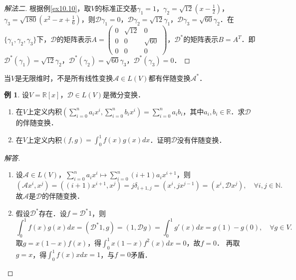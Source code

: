 \documentclass[a4paper,fontset=windows]{ctexbook}
\theoremstyle{definition}
\newtheorem{example}{例}[chapter]
\begin{document}
\begin{proof}[解法二]
根据例\ref{ex10.10}，取$V$的标准正交基$\gamma_1=1$，$\gamma_2=\sqrt{12}(x-\frac{1}{2})$，$\gamma_3=\sqrt{180}(x^2-x+\frac{1}{6})$，则$\mathcal{D}\gamma_1=0$，$\mathcal{D}\gamma_2=\sqrt{12}\gamma_1$，$\mathcal{D}\gamma_3=\sqrt{60}\gamma_2$．在$\{\gamma_1,\gamma_2,\gamma_3\}$下，$\mathcal{D}$的矩阵表示$A=\begin{pmatrix}0&\sqrt{12}&0 \\ 0&0&\sqrt{60} \\ 0&0&0\end{pmatrix}$，$\mathcal{D}^*$的矩阵表示$B=A^T$．即$\mathcal{D}^*(\gamma_1)=\sqrt{12}\gamma_2$，$\mathcal{D}^*(\gamma_2)=\sqrt{60}\gamma_3$，$\mathcal{D}^*(\gamma_3)=0$．
\end{proof}

当$V$是无限维时，不是所有线性变换$\mathcal{A}\in L(V)$都有伴随变换$\mathcal{A}^*$．

\begin{example}
设$V=\mathbb{R}[x]$，$\mathcal{D}\in L(V)$是微分变换．
\begin{enumerate}
\item 在$V$上定义内积$\left(\sum\limits_{i=0}^na_ix^i,\sum\limits_{i=0}^nb_ix^i\right)=\sum\limits_{i=0}^na_ib_i$，其中$a_i,b_i\in\mathbb{R}$．求$\mathcal{D}$的伴随变换．

\item 在$V$上定义内积$(f,g)=\int_0^1f(x)g(x)dx$．证明$\mathcal{D}$没有伴随变换．
\end{enumerate}
\end{example}

\begin{proof}[解答]~
\begin{enumerate}
\item 设$\mathcal{A}\in L(V)$，$\sum\limits_{i=0}^na_ix^i\mapsto\sum\limits_{i=0}^n(i+1)a_ix^{i+1}$，则
$$(\mathcal{A}x^i,x^j)=\left((i+1)x^{i+1},x^j\right)=j\delta_{i+1,j}=\left(x^i,jx^{j-1}\right)=(x^i,\mathcal{D}x^j),\quad\forall i,j\in\mathbb{N}.$$
故$\mathcal{A}$是$\mathcal{D}$的伴随变换．

\item 假设$\mathcal{D}^*$存在．设$f=\mathcal{D}^*1$，则
$$\int_0^1f(x)g(x)dx=(\mathcal{D}^*1,g)=(1,\mathcal{D}g)=\int_0^1g'(x)dx=g(1)-g(0),\quad\forall g\in V.$$
取$g=x(1-x)f(x)$，得$\int_0^1x(1-x)f^2(x)dx=0$，故$f=0$．
再取$g=x$，得$\int_0^1f(x)xdx=1$，与$f=0$矛盾．\qedhere
\end{enumerate}
\end{proof}
\end{document}
